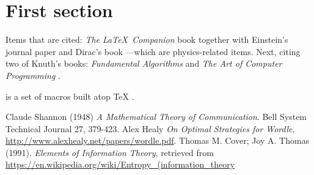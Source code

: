 \documentclass[11pt, oneside]{article}   	%
\begin{document}
\section{First section}

Items that are cited: \textit{The \LaTeX\ Companion} book \cite{latexcompanion} together with Einstein's journal paper \cite{einstein} and Dirac's book \cite{dirac}---which are physics-related items. Next, citing two of Knuth's books: \textit{Fundamental Algorithms} \cite{knuth-fa} and \textit{The Art of Computer Programming} \cite{knuth-acp}.

\cite{lamport94} is a set of macros built atop \TeX{} \cite{1}.

\begin{thebibliography}{9}
Claude Shannon (1948) \emph{A Mathematical Theory of Communication}. Bell System Technical Journal 27, 379-423.
Alex Healy \emph{On Optimal Strategies for Wordle}, \url{http://www.alexhealy.net/papers/wordle.pdf}.
Thomas M. Cover; Joy A. Thomas (1991). \emph{Elements of Information Theory}, retrieved from \url{https://en.wikipedia.org/wiki/Entropy_(information_theory}
\end{thebibliography}
\end{document}

